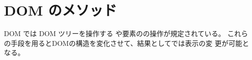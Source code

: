 \section{DOM のメソッド}
DOM では DOM ツリーを操作する%
や要素のの操作が規定されている。
これらの手段を用るとDOMの構造を変化させて、結果として\HTML では表示の変
更が可能となる。
\iffalse
 メソッド%
 では次のようなものあがある。
\begin{itemize}
 \item 条件に合う要素または要素のリストを得る。
 \item 要素の属性の参照、変更ができる。
 \item 要素を新規に作成する。
 \item ある要素に子要素を追加したり、取り除いたりする。
\end{itemize}
プロパティはそのオブジェクトが持つ性質であり、それらの値を参照できる。ほ
とんどのプロパティは書き直しできない。
\fi
\iffalse
なお、ここでのメソッドやプロパティは DOM文書で使用可能なものである。したがっ
て、\HTML も \DOM{} をサポートするブラウザであれば同様の方法で
部分的に書き直すことが可能である。
\fi

